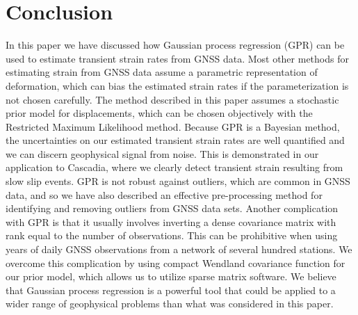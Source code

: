 \documentclass[10pt,letter]{article}
\begin{document}


\section{Conclusion}\label{sec:Conclusion}
In this paper we have discussed how Gaussian process regression (GPR) can be used to estimate transient strain rates from GNSS data. Most other methods for estimating strain from GNSS data assume a parametric representation of deformation, which can bias the estimated strain rates if the parameterization is not chosen carefully. The method described in this paper assumes a stochastic prior model for displacements, which can be chosen objectively with the Restricted Maximum Likelihood method. Because GPR is a Bayesian method, the uncertainties on our estimated transient strain rates are well quantified and we can discern geophysical signal from noise. This is demonstrated in our application to Cascadia, where we clearly detect transient strain resulting from slow slip events. GPR is not robust against outliers, which are common in GNSS data, and so we have also described an effective pre-processing method for identifying and removing outliers from GNSS data sets. Another complication with GPR is that it usually involves inverting a dense covariance matrix with rank equal to the number of observations. This can be prohibitive when using years of daily GNSS observations from a network of several hundred stations.  We overcome this complication by using compact Wendland covariance function for our prior model, which allows us to utilize sparse matrix software. We believe that Gaussian process regression is a powerful tool that could be applied to a wider range of geophysical problems than what was considered in this paper.   





\end{document}
